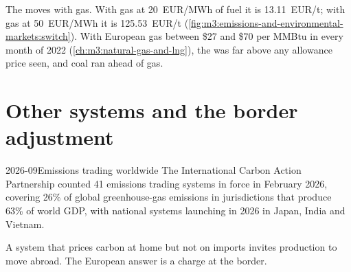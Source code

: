 The  moves with gas. With gas at \qty{20}{EUR/MWh} of fuel it is
\qty{13.11}{EUR/t}; with gas at \qty{50}{EUR/MWh} it is \qty{125.53}{EUR/t}
(\cref{fig:m3:emissions-and-environmental-markets:switch}). With European gas between \$27 and
\$70 per MMBtu in every month of 2022 (\cref{ch:m3:natural-gas-and-lng}), the  was
far above any allowance price seen, and coal ran ahead of gas.

\begin{omfigure}

\label{fig:m3:emissions-and-environmental-markets:switch}
\end{omfigure}

\section{Other systems and the border adjustment}

\begin{dated}{2026-09}{Emissions trading worldwide}\label{dat:m3:emissions-and-environmental-markets:world}
The International Carbon Action Partnership counted 41 emissions trading systems in force in
February 2026, covering 26\% of global greenhouse-gas emissions in jurisdictions that produce 63\%
of world GDP, with national systems launching in 2026 in Japan, India and Vietnam.
\end{dated}

A system that prices carbon at home but not on imports invites production to move abroad. The
European answer is a charge at the border.

